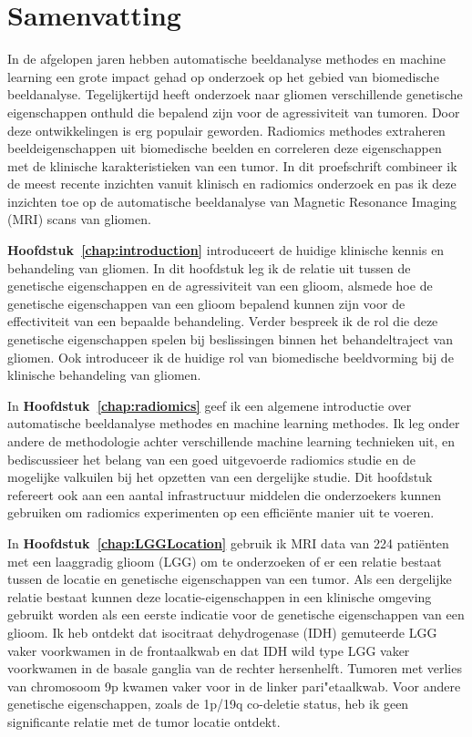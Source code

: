 \chapter{Samenvatting}
\begin{ChapterAbstractNoTitle}
\end{ChapterAbstractNoTitle}

In de afgelopen jaren hebben automatische beeldanalyse methodes en machine learning een grote impact gehad op onderzoek op het gebied van biomedische beeld\-analyse.
Tegelijkertijd heeft onderzoek naar gliomen verschillende genetische eigenschappen onthuld die bepalend zijn voor de agressiviteit van tumoren.
Door deze ontwikkelingen is  erg populair geworden.
Radiomics methodes extraheren beeldeigenschappen uit biomedische beelden en correleren deze eigenschappen met de klinische karakteristieken van een tumor.
In dit proefschrift combineer ik de meest recente inzichten vanuit klinisch en radiomics onderzoek en pas ik deze inzichten toe op de automatische beeldanalyse van Magnetic Resonance Imaging (MRI) scans van gliomen.


\textbf{Hoofdstuk~\ref{chap:introduction}} introduceert de huidige klinische kennis en behandeling van gliomen.
In dit hoofdstuk leg ik de relatie uit tussen de genetische eigenschappen en de agressiviteit van een glioom, alsmede hoe de genetische eigenschappen van een glioom bepalend kunnen zijn voor de effectiviteit van een bepaalde behandeling.
Verder bespreek ik de rol die deze genetische eigenschappen spelen bij beslissingen binnen het behandeltraject van gliomen.
Ook introduceer ik de huidige rol van biomedische beeldvorming bij de klinische behandeling van gliomen.

In \textbf{Hoofdstuk~\ref{chap:radiomics}} geef ik een algemene introductie over automatische beeldanalyse methodes en machine learning methodes.
Ik leg onder andere de methodologie achter verschillende machine learning technieken uit, en bediscussieer het belang van een goed uitgevoerde radiomics studie en de mogelijke valkuilen bij het opzetten van een dergelijke studie.
Dit hoofdstuk refereert ook aan een aantal infrastructuur middelen die onderzoekers kunnen gebruiken om radiomics experimenten op een effici{\"e}nte manier uit te voeren.

In \textbf{Hoofdstuk~\ref{chap:LGGLocation}} gebruik ik MRI data van 224 pati{\"e}nten met een  laaggradig glioom (LGG) om te onderzoeken of er een relatie bestaat tussen de locatie en genetische eigenschappen van een tumor.
Als een dergelijke relatie bestaat kunnen deze locatie-eigenschappen in een klinische omgeving gebruikt worden als een eerste indicatie voor de genetische eigenschappen van een glioom.
Ik heb ontdekt dat isocitraat dehydrogenase (IDH) gemuteerde LGG vaker voorkwamen in de frontaalkwab en dat IDH wild type LGG vaker voorkwamen in de basale ganglia van de rechter hersenhelft.
Tumoren met verlies van chromosoom 9p kwamen vaker voor in de linker pari{"e}taalkwab.
Voor andere genetische eigenschappen, zoals de 1p/19q co-deletie status, heb ik geen significante relatie met de tumor locatie ontdekt.

